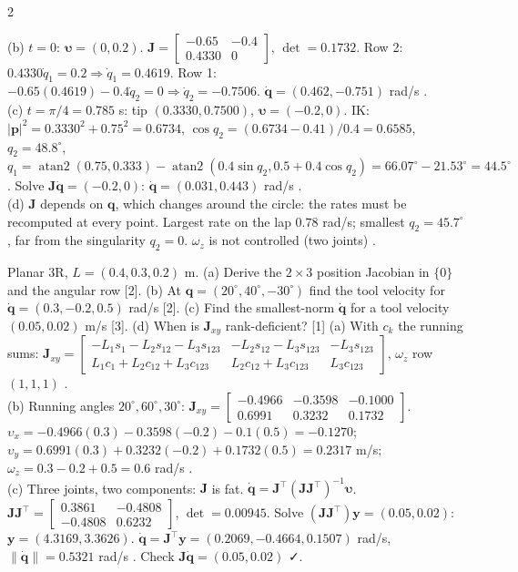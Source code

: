 \begin{multicols}{2}
\begin{examq}
(b) $t=0$: $\boldsymbol\upsilon=(0,0.2)$. $\mathbf J=\begin{bmatrix}-0.65&-0.4\\0.4330&0\end{bmatrix}$, $\det=0.1732$. Row 2: $0.4330\dot q_1=0.2\Rightarrow\dot q_1=0.4619$. Row 1: $-0.65(0.4619)-0.4\dot q_2=0\Rightarrow\dot q_2=-0.7506$. $\dot{\mathbf q}=(0.462,-0.751)$ rad/s .\\
(c) $t=\pi/4=0.785$ s: tip $(0.3330,0.7500)$, $\boldsymbol\upsilon=(-0.2,0)$. IK: $|\mathbf p|^2=0.3330^2+0.75^2=0.6734$, $\cos q_2=(0.6734-0.41)/0.4=0.6585$, $q_2=48.8^\circ$, $q_1=\operatorname{atan2}(0.75,0.333)-\operatorname{atan2}(0.4\sin q_2,0.5+0.4\cos q_2)=66.07^\circ-21.53^\circ=44.5^\circ$. Solve $\mathbf J\dot{\mathbf q}=(-0.2,0)$: $\dot{\mathbf q}=(0.031,0.443)$ rad/s .\\
(d) $\mathbf J$ depends on $\mathbf q$, which changes around the circle: the rates must be recomputed at every point. Largest rate on the lap $0.78$ rad/s; smallest $q_2=45.7^\circ$, far from the singularity $q_2=0$. $\omega_z$ is not controlled (two joints) . \chk
\end{examq}
\begin{examq}
Planar 3R, $L=(0.4,0.3,0.2)$ m. (a) Derive the $2\times3$ position Jacobian in $\{0\}$ and the angular row [2]. (b) At $\mathbf q=(20^\circ,40^\circ,-30^\circ)$ find the tool velocity for $\dot{\mathbf q}=(0.3,-0.2,0.5)$ rad/s [2]. (c) Find the smallest-norm $\dot{\mathbf q}$ for a tool velocity $(0.05,0.02)$ m/s [3]. (d) When is $\mathbf J_{xy}$ rank-deficient? [1]
\solution
(a) With $c_k$ the running sums: $\mathbf J_{xy}=\begin{bmatrix}-L_1s_1-L_2s_{12}-L_3s_{123}&-L_2s_{12}-L_3s_{123}&-L_3s_{123}\\L_1c_1+L_2c_{12}+L_3c_{123}&L_2c_{12}+L_3c_{123}&L_3c_{123}\end{bmatrix}$, $\omega_z$ row $(1,1,1)$ .\\
(b) Running angles $20^\circ,60^\circ,30^\circ$: $\mathbf J_{xy}=\begin{bmatrix}-0.4966&-0.3598&-0.1000\\0.6991&0.3232&0.1732\end{bmatrix}$. $\upsilon_x=-0.4966(0.3)-0.3598(-0.2)-0.1(0.5)=-0.1270$; $\upsilon_y=0.6991(0.3)+0.3232(-0.2)+0.1732(0.5)=0.2317$ m/s; $\omega_z=0.3-0.2+0.5=0.6$ rad/s .\\
(c) Three joints, two components: $\mathbf J$ is fat. $\dot{\mathbf q}=\mathbf J^\top(\mathbf J\mathbf J^\top)^{-1}\boldsymbol\upsilon$. $\mathbf J\mathbf J^\top=\begin{bmatrix}0.3861&-0.4808\\-0.4808&0.6232\end{bmatrix}$, $\det=0.00945$. Solve $(\mathbf J\mathbf J^\top)\mathbf y=(0.05,0.02)$: $\mathbf y=(4.3169,3.3626)$. $\dot{\mathbf q}=\mathbf J^\top\mathbf y=(0.2069,-0.4664,0.1507)$ rad/s, $\|\dot{\mathbf q}\|=0.5321$ rad/s . Check $\mathbf J\dot{\mathbf q}=(0.05,0.02)$ ✓.\\

\end{examq}
\end{multicols}
